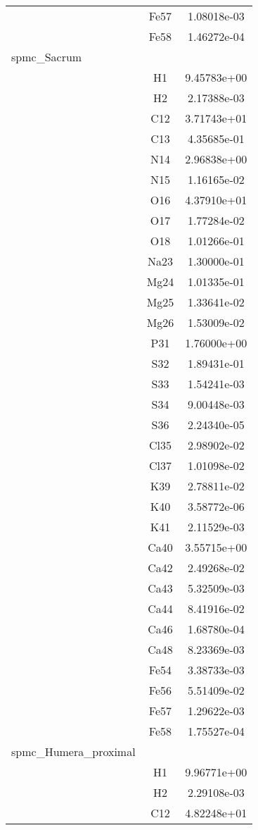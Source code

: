 \begin{centering}
\begin{longtable}{l c c}
& Fe57 & 1.08018e-03 \\ 
& Fe58 & 1.46272e-04 \\ 
\hline
spmc\_Sacrum & & \\
\hline
& H1 & 9.45783e+00 \\ 
& H2 & 2.17388e-03 \\ 
& C12 & 3.71743e+01 \\ 
& C13 & 4.35685e-01 \\ 
& N14 & 2.96838e+00 \\ 
& N15 & 1.16165e-02 \\ 
& O16 & 4.37910e+01 \\ 
& O17 & 1.77284e-02 \\ 
& O18 & 1.01266e-01 \\ 
& Na23 & 1.30000e-01 \\ 
& Mg24 & 1.01335e-01 \\ 
& Mg25 & 1.33641e-02 \\ 
& Mg26 & 1.53009e-02 \\ 
& P31 & 1.76000e+00 \\ 
& S32 & 1.89431e-01 \\ 
& S33 & 1.54241e-03 \\ 
& S34 & 9.00448e-03 \\ 
& S36 & 2.24340e-05 \\ 
& Cl35 & 2.98902e-02 \\ 
& Cl37 & 1.01098e-02 \\ 
& K39 & 2.78811e-02 \\ 
& K40 & 3.58772e-06 \\ 
& K41 & 2.11529e-03 \\ 
& Ca40 & 3.55715e+00 \\ 
& Ca42 & 2.49268e-02 \\ 
& Ca43 & 5.32509e-03 \\ 
& Ca44 & 8.41916e-02 \\ 
& Ca46 & 1.68780e-04 \\ 
& Ca48 & 8.23369e-03 \\ 
& Fe54 & 3.38733e-03 \\ 
& Fe56 & 5.51409e-02 \\ 
& Fe57 & 1.29622e-03 \\ 
& Fe58 & 1.75527e-04 \\ 
\hline
spmc\_Humera\_proximal & & \\
\hline
& H1 & 9.96771e+00 \\ 
& H2 & 2.29108e-03 \\ 
& C12 & 4.82248e+01 \\ 

\end{longtable}
\end{centering}
